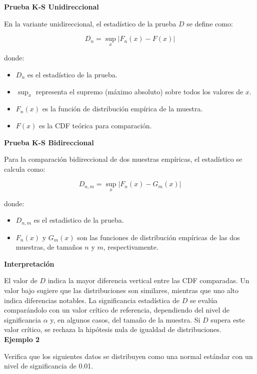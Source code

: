 \documentclass{article}
\begin{document}
\textbf{Prueba K-S Unidireccional}

En la variante unidireccional, el estadístico de la prueba \(D\) se define como:

\begin{equation}
    D_n = \sup_x |F_n(x) - F(x)|
\end{equation}

donde:
\begin{itemize}
    \item \(D_n\) es el estadístico de la prueba.
    \item \(\sup_x\) representa el supremo (máximo absoluto) sobre todos los valores de \(x\).
    \item \(F_n(x)\) es la función de distribución empírica de la muestra.
    \item \(F(x)\) es la CDF teórica para comparación.
\end{itemize}

\textbf{Prueba K-S Bidireccional}

Para la comparación bidireccional de dos muestras empíricas, el estadístico se calcula como:

\begin{equation}
    D_{n,m} = \sup_x |F_{n}(x) - G_{m}(x)|
\end{equation}

donde:
\begin{itemize}
    \item \(D_{n,m}\) es el estadístico de la prueba.
    \item \(F_{n}(x)\) y \(G_{m}(x)\) son las funciones de distribución empíricas de las dos muestras, de tamaños \(n\) y \(m\), respectivamente.
\end{itemize}

\textbf{Interpretación}

El valor de \(D\) indica la mayor diferencia vertical entre las CDF comparadas. Un valor bajo sugiere que las distribuciones son similares, mientras que uno alto indica diferencias notables. La significancia estadística de \(D\) se evalúa comparándolo con un valor crítico de referencia, dependiendo del nivel de significancia \(\alpha\) y, en algunos casos, del tamaño de la muestra. Si \(D\) supera este valor crítico, se rechaza la hipótesis nula de igualdad de distribuciones. \\
\newpage
\textbf{Ejemplo 2}

Verifica que los siguientes datos se distribuyen como una normal estándar con un nivel de significancia de  0.01.
\end{document}
